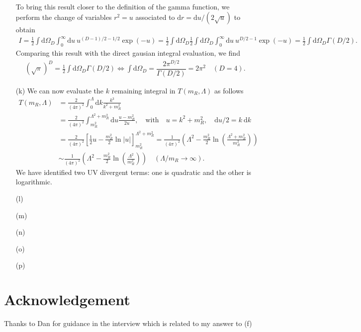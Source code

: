 \documentclass[10pt, a4paper]{article}
\begin{document}
\begin{enumerate}
\begin{align*}
  \end{align*}
  To bring this result closer to the definition of the gamma function, we perform the change of variables $r^2 = u$ associated to $\text{d}r = \text{d}u/(2\sqrt{u})$ to obtain
  \begin{align*}
    I =\frac{1}{2}\int \text{d}\Omega_D \int_{0}^{\infty} \text{d}u \ u^{(D-1)/2-1/2}  \exp\left(-u\right) = \frac{1}{2} \int \text{d}\Omega_D \frac{1}{2}\int \text{d}\Omega_D \int_{0}^{\infty} \text{d}u \ u^{D/2 - 1}  \exp\left(-u\right) = \frac{1}{2} \int \text{d}\Omega_D \Gamma(D/2).
  \end{align*}
  Comparing this result with the direct gausian integral evaluation, we find
  \begin{align*}
    (\sqrt{\pi})^D = \frac{1}{2} \int \text{d}\Omega_D \Gamma(D/2) \iff \int \text{d}\Omega_D = \dfrac{2 \pi^{D/2}}{\Gamma(D/2)} =  2 \pi^2 \quad (D=4). 
  \end{align*}
  \newpage
  \item[(k)] We can now evaluate the $k$ remaining integral in $T(m_R, \Lambda)$ as follows
  \begin{align*}
    T(m_R, \Lambda) &= \frac{2}{(4\pi)^2} \int_0^{\Lambda} \text{d}k \frac{k^3}{k^2 + m_R^2}\\
    &= \frac{2}{(4\pi)^2} \int_{m_R^2}^{\Lambda^2 + m_R^2} \text{d}u \frac{u-m_R^2}{2u}, \quad \text{with} \quad u = k^2 + m_R^2, \quad \text{d}u/2 = k \ \text{d}k\\
    &= \frac{2}{(4\pi)^2} \left[\frac{1}{2}u - \frac{m_R^2}{2} \ln|u|\right]_{m_R^2}^{\Lambda^2 + m_R^2} = \frac{1}{(4\pi)^2} \left(\Lambda^2 - \frac{m_R^2}{2} \ln\left(\frac{\Lambda^2 + m_R^2}{m_R^2}\right)\right)\\& \sim \frac{1}{(4\pi)^2} \left(\Lambda^2 - \frac{m_R^2}{2} \ln\left(\frac{\Lambda^2}{m_R^2}\right)\right)\quad (\Lambda/m_R \to \infty).
  \end{align*}
  We have identified two UV divergent terms: one is quadratic and the other is logarithmic.
  \item[(l)]
  \item[(m)]
  \item[(n)]
  \item[(o)]
  \item[(p)] 
\end{enumerate}


\section{Acknowledgement}

Thanks to Dan for guidance in the interview which is related to my answer to (f)




\makereferences


\end{document}
